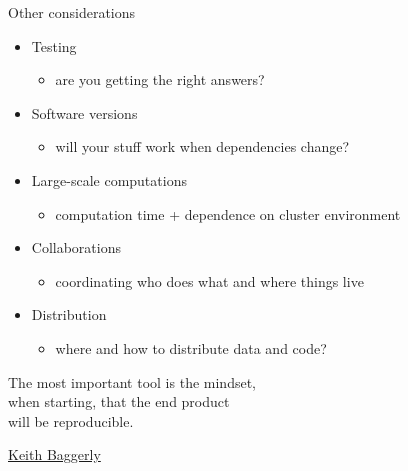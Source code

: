 \documentclass[12pt,t]{beamer}
\begin{document}
\begin{frame}[c]{Other considerations}

  \begin{itemize}
    \itemsep12pt
  \item Testing
    \begin{itemize}
    \item[] {\lolit are you getting the right answers?}
    \end{itemize}
  \item Software versions
    \begin{itemize}
    \item[] {\lolit will your stuff work when dependencies change?}
    \end{itemize}
  \item Large-scale computations
    \begin{itemize}
    \item[] {\lolit computation time + dependence on cluster environment}
    \end{itemize}
  \item Collaborations
    \begin{itemize}
    \item[] {\lolit coordinating who does what and where things live}
    \end{itemize}
  \item Distribution
    \begin{itemize}
    \item[] {\lolit where and how to distribute data and code?}
    \end{itemize}
  \end{itemize}


\end{frame}


\begin{frame}[c]{}

\begin{center}
\large
The most important tool is the {\hilit mindset},\\
when starting, that the end product \\
will be reproducible.
\end{center}

\hfill
{\lolit
{\textendash} \href{http://odin.mdacc.tmc.edu/~kabaggerly/}{Keith Baggerly}
}

\end{frame}
\end{document}
